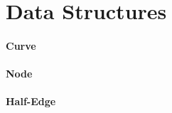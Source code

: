 \section{Data Structures} \label{app:datastructure}



\paragraph{Curve}





\paragraph{Node}

        


\paragraph{Half-Edge}



        
